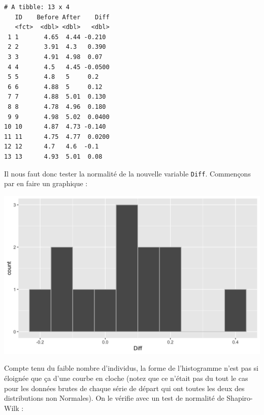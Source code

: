 \documentclass[a4paperpaper,]{article}
\newenvironment{Shaded}{\begin{snugshade}}{\end{snugshade}}
\newcommand{\DataTypeTok}[1]{\textcolor[rgb]{0.00,0.34,0.68}{#1}}
\newcommand{\DecValTok}[1]{\textcolor[rgb]{0.69,0.50,0.00}{#1}}
\newcommand{\FloatTok}[1]{\textcolor[rgb]{0.69,0.50,0.00}{#1}}
\newcommand{\KeywordTok}[1]{\textcolor[rgb]{0.12,0.11,0.11}{\textbf{#1}}}
\newcommand{\NormalTok}[1]{\textcolor[rgb]{0.12,0.11,0.11}{#1}}
\newcommand{\OperatorTok}[1]{\textcolor[rgb]{0.12,0.11,0.11}{#1}}
\newcommand{\StringTok}[1]{\textcolor[rgb]{0.75,0.01,0.01}{#1}}
\begin{document}
\begin{verbatim}
# A tibble: 13 x 4
   ID    Before After    Diff
   <fct>  <dbl> <dbl>   <dbl>
 1 1       4.65  4.44 -0.210 
 2 2       3.91  4.3   0.390 
 3 3       4.91  4.98  0.07  
 4 4       4.5   4.45 -0.0500
 5 5       4.8   5     0.2   
 6 6       4.88  5     0.12  
 7 7       4.88  5.01  0.130 
 8 8       4.78  4.96  0.180 
 9 9       4.98  5.02  0.0400
10 10      4.87  4.73 -0.140 
11 11      4.75  4.77  0.0200
12 12      4.7   4.6  -0.1   
13 13      4.93  5.01  0.08  
\end{verbatim}

Il nous faut donc tester la normalité de la nouvelle variable \texttt{Diff}. Commençons par en faire un graphique :

\begin{Shaded}
\end{Shaded}

\begin{center}\includegraphics[width=0.9\linewidth]{figure/unnamed-chunk-38-1} \end{center}

Compte tenu du faible nombre d'individus, la forme de l'histogramme n'est pas si éloignée que ça d'une courbe en cloche (notez que ce n'était pas du tout le cas pour les données brutes de chaque série de départ qui ont toutes les deux des distributions non Normales). On le vérifie avec un test de normalité de Shapiro-Wilk :
\end{document}
